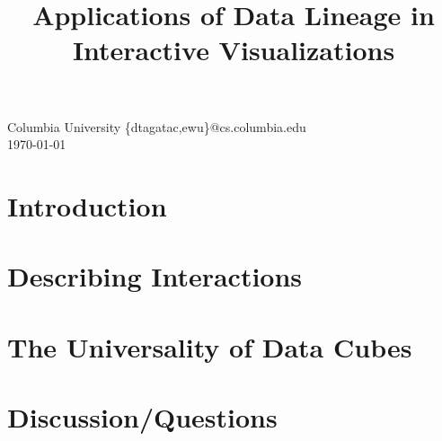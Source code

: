\documentclass[fleqn,reprint]{sigplanconf}
\theoremstyle{plain}
\theoremstyle{definition}
\theoremstyle{remark}
\begin{document}
\setlength{\pdfpageheight}{\paperheight}
\setlength{\pdfpagewidth}{\paperwidth}


\title{Applications of Data Lineage in Interactive Visualizations}
           {Columbia University}
           {\{dtagatac,ewu\}@cs.columbia.edu\\\today}
\maketitle



\section{Introduction}


\section{Describing Interactions}


\section{The Universality of Data Cubes}


\section{Discussion/Questions}




\end{document}
